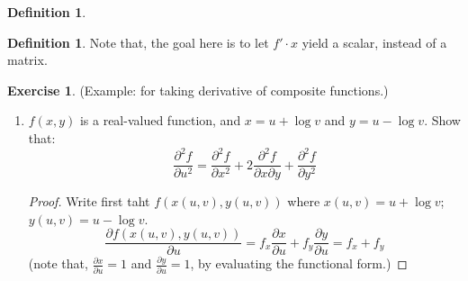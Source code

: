 \documentclass[12pt]{article}
\theoremstyle{definition}
\newtheorem{definition}[theorem]{Definition}
\newtheorem{exercise}[theorem]{Exercise}
\theoremstyle{plain}
\begin{document}
\begin{definition}
\begin{definition}
        Note that, the goal here is to let $f' \cdot x$ yield a scalar, instead 
        of a matrix.
    \end{definition}
\end{definition}

\begin{exercise}
    (Example: for taking derivative of composite functions.)

    \begin{enumerate}
        \item $f(x,y)$ is a real-valued function, and $x = u + \log v$ and 
            $y = u - \log v$. Show that: 
            \[
                \frac{\partial^2 f}{\partial u^2 } = \frac{\partial^2 
                    f}{\partial x^2} + 2 \frac{\partial^2 f}{\partial x 
                \partial y} + \frac{\partial ^2 f }{ \partial y^2}
            \]
            \begin{proof}
                Write first taht $f(x(u,v), y(u,v))$ where $x(u,v) = u + 
                \log v$; $y(u,v) = u  - \log v$.
                \[
                    \frac{\partial f(x(u,v), y(u,v))}{\partial u} = f_x 
                    \frac{\partial x}{\partial u} + f_y 
                    \frac{\partial y}{ \partial u} = f_x + f_y
                \]
                (note that, $\frac{\partial x}{\partial u}  = 1$ and 
                $\frac{\partial y}{\partial u} = 1$, by evaluating the 
                    functional form.)


\end{proof}
\end{enumerate}
\end{exercise}
\end{document}
